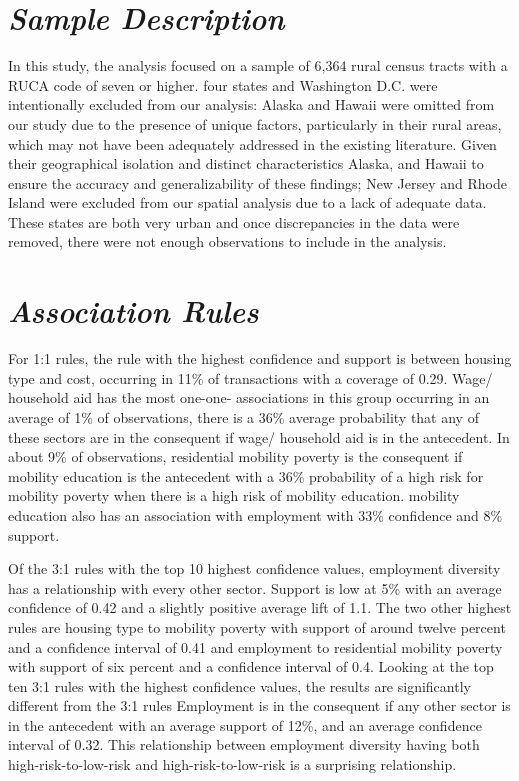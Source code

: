 \section{\textit{Sample Description}}

In this study, the analysis focused on a sample of 6,364 rural census tracts with a RUCA code of seven or higher. four states and Washington D.C. were intentionally excluded from our analysis: Alaska and Hawaii were omitted from our study due to the presence of unique factors, particularly in their rural areas, which may not have been adequately addressed in the existing literature. Given their geographical isolation and distinct characteristics Alaska, and Hawaii to ensure the accuracy and generalizability of these findings; New Jersey and Rhode Island were excluded from our spatial analysis due to a lack of adequate data. These states are both very urban and once discrepancies in the data were removed, there were not enough observations to include in the analysis.  

\section{\textit{Association Rules}}
For 1:1 rules, the rule with the highest confidence and support is between housing type and cost, occurring in 11\% of transactions with a coverage of 0.29. Wage/ household aid has the most one-one- associations in this group occurring in an average of 1\% of observations, there is a 36\% average probability that any of these sectors are in the consequent if wage/ household aid is in the antecedent. In about 9\% of observations, residential mobility poverty is the consequent if mobility education is the antecedent with a 36\% probability of a high risk for mobility poverty when there is a high risk of mobility education. mobility education also has an association with employment with 33\% confidence and 8\% support. 

Of the 3:1 rules with the top 10 highest confidence values, employment diversity has a relationship with every other sector. Support is low at 5\% with an average confidence of 0.42 and a slightly positive average lift of 1.1. The two other highest rules are housing type to mobility poverty with support of around twelve percent and a confidence interval of 0.41 and employment to residential mobility poverty with support of six percent and a confidence interval of 0.4. Looking at the top ten 3:1 rules with the highest confidence values, the results are significantly different from the 3:1 rules Employment is in the consequent if any other sector is in the antecedent with an average support of 12\%, and an average confidence interval of 0.32. This relationship between employment diversity having both high-risk-to-low-risk and high-risk-to-low-risk is a surprising relationship. 

